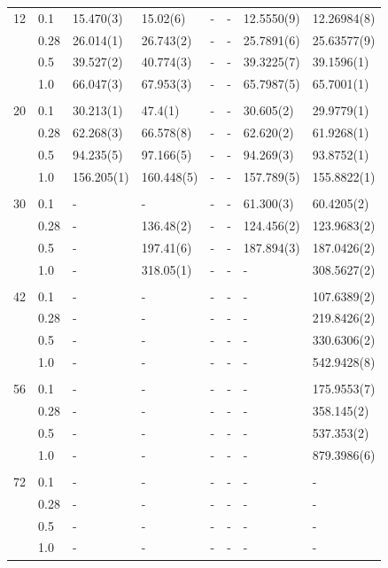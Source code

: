 \begin{table} [H]
\begin{tabularx}{\textwidth}{l:l|XXXXXX}
		12 & 0.1 & 15.470(3) & 15.02(6) & - & - & 12.5550(9) & 12.26984(8) \\ 
		& 0.28 & 26.014(1) & 26.743(2) & - & - & 25.7891(6) & 25.63577(9) \\
		& 0.5 & 39.527(2) & 40.774(3) & - & - & 39.3225(7) & 39.1596(1) \\
		& 1.0 & 66.047(3) & 67.953(3) & - & - & 65.7987(5) & 65.7001(1) \\ \hdashline \\
		
		20 & 0.1 & 30.213(1) & 47.4(1) & - & - & 30.605(2) & 29.9779(1) \\ 
		& 0.28 & 62.268(3) & 66.578(8) & - & - & 62.620(2) & 61.9268(1) \\
		& 0.5 & 94.235(5) & 97.166(5) & - & - & 94.269(3) & 93.8752(1) \\
		& 1.0 & 156.205(1) & 160.448(5) & - & - & 157.789(5) & 155.8822(1) \\ \hdashline \\
		
		30 & 0.1 & - & - & - & - & 61.300(3) & 60.4205(2) \\ 
		& 0.28 & - & 136.48(2) & - & - & 124.456(2) & 123.9683(2) \\
		& 0.5 & - & 197.41(6) & - & - & 187.894(3) & 187.0426(2) \\
		& 1.0 & - & 318.05(1) & - & - & - & 308.5627(2) \\ \hdashline \\
		
		42 & 0.1 & - & - & - & - & - & 107.6389(2) \\ 
		& 0.28 & - & - & - & - & - & 219.8426(2) \\
		& 0.5 & - & - & - & - & - & 330.6306(2) \\
		& 1.0 & - & - & - & - & - & 542.9428(8) \\ \hdashline \\
		
		56 & 0.1 & - & - & - & - & - & 175.9553(7) \\ 
		& 0.28 & - & - & - & - & - & 358.145(2) \\
		& 0.5 & - & - & - & - & - & 537.353(2) \\
		& 1.0 & - & - & - & - & - & 879.3986(6) \\ \hdashline \\
		
		72 & 0.1 & - & - & - & - & - & - \\ 
		& 0.28 & - & - & - & - & - & - \\
		& 0.5 & - & - & - & - & - & - \\
		& 1.0 & - & - & - & - & - & - \\ \hline\hline
	\end{tabularx}
\end{table}

